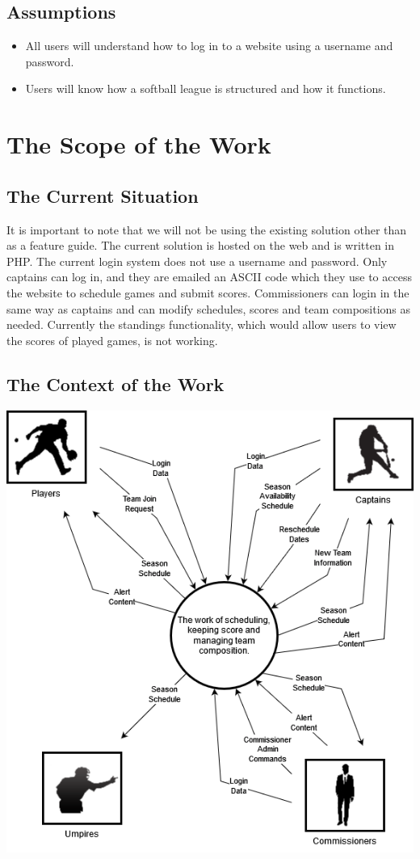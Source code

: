 \documentclass[12pt]{article}
\begin{document}
\subsection{Assumptions}
\begin{itemize}
  \item All users will understand how to log in to a website using a username
  and password.
  \item Users will know how a softball league is structured and how it functions.
\end{itemize}

\section{The Scope of the Work}
\subsection{The Current Situation}
It is important to note that we will not be using the existing solution other
than as a feature guide. The current solution is hosted on the web and is
written in PHP. The current login system does not use a username and password.
Only captains can log in, and they are emailed an ASCII code which they use to
access the website to schedule games and submit scores. Commissioners can login
in the same way as captains and can modify schedules, scores and team
compositions as needed. Currently the standings functionality, which would
allow users to view the scores of played games, is not working.
\subsection{The Context of the Work}
\includegraphics[scale=0.6]{6b_context_diagram.png}
\end{document}

